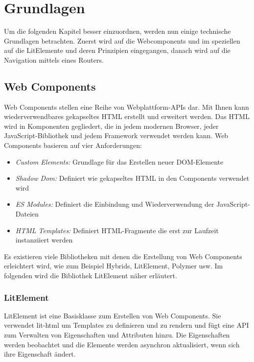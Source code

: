 \documentclass[12pt,					%
							 oneside,			%
							 a4paper,			%
							 halfparskip,		%
							 liststotoc,			%
							 bibtotoc,			%
							 fleqn,				%
							 pointlessnumbers]	%
							 {scrreprt}
\begin{document}
\chapter{Grundlagen}		
Um die folgenden Kapitel besser einzuordnen, werden nun einige technische Grundlagen betrachten. Zuerst wird auf die Webcomponents und im speziellen auf die LitElemente und deren Prinzipien eingegangen, danach wird auf die Navigation mittels eines Routers.
	
		\section{Web Components}
		Web Components stellen eine Reihe von Webplattform-APIs dar. Mit Ihnen kann wiederverwendbares gekapseltes HTML erstellt und erweitert werden. Das HTML wird in Komponenten gegliedert, die in jedem modernen Browser, jeder JavaScript-Bibliothek und jedem Framework verwendet werden kann. Web Components basieren auf vier Anforderungen: 
\begin{itemize}
\item \textit{Custom Elements:} Grundlage für das Erstellen neuer DOM-Elemente
\item \textit{Shadow Dom:} Definiert wie gekapseltes HTML in den Components verwendet wird
\item \textit{ES Modules:} Definiert die Einbindung und Wiederverwendung der JavaScript-Dateien
\item \textit{HTML Templates:} Definiert HTML-Fragmente die erst zur Laufzeit instanziiert werden
\end{itemize} Es existieren viele Bibliotheken mit denen die Erstellung von Web Components erleichtert wird, wie zum Beispiel Hybrids, LitElement, Polymer usw. Im folgenden wird die Bibliothek LitElement näher erläutert.\cite{webcom}

				\subsection{LitElement}
				LitElement ist eine Basisklasse zum Erstellen von Web Components. Sie verwendet lit-html um Templates zu definieren und zu rendern und fügt eine API zum Verwalten von Eigenschaften und Attributen hinzu.  Die Eigenschaften werden beobachtet und die Elemente werden asynchron aktualisiert, wenn sich ihre Eigenschaft ändert. 
\end{document}
